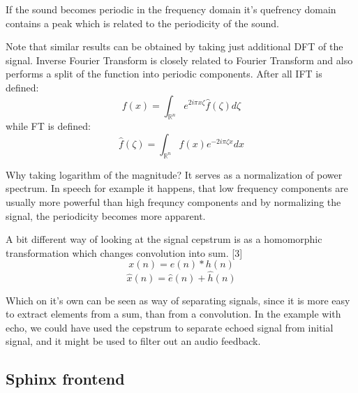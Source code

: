 \documentclass[12pt,a4paper,english]{article}
\begin{document}
\begin{minipage}[5cm,0]{9cm}

If the sound becomes periodic in the frequency domain it's quefrency domain contains a peak which is related to the periodicity of the sound. \newline

Note that similar results can be obtained by taking just additional DFT of the signal. Inverse Fourier Transform is closely related to Fourier Transform and also performs a split of the function into periodic components. \newline
\newline
After all IFT is defined:
\begin{equation}
     f(x) = \int_{\mathbb{R} ^ n} e^{2 i \pi x \zeta} \hat{f}(\zeta) d\zeta
\end{equation}
while FT is defined: 
\begin{equation}
    \hat{f}(\zeta) = \int_{\mathbb{R} ^ n} f(x) e^{-2 i \pi \zeta x} dx
\end{equation}

Why taking logarithm of the magnitude? It serves as a normalization of power spectrum. In speech for example it happens, that low frequency components are usually more powerful than high frequncy components and by normalizing the signal, the periodicity becomes more apparent. \newline


A bit different way of looking at the signal cepstrum is as a homomorphic transformation which changes convolution into sum. [3]
\begin{equation}
x(n) = e(n) * h(n)
\end{equation}
\begin{equation}
\hat x(n) = \hat e(n) + \hat h(n)
\end{equation}


Which on it's own can be seen as way of separating signals, since it is more easy to extract elements from a sum, than from a convolution.
\newline
\newline
In the example with echo, we could have used the cepstrum to separate echoed signal from initial signal, and it might be used to filter out an audio feedback.

\end{minipage}

\newpage
\subsection{Sphinx frontend}
\end{document}
